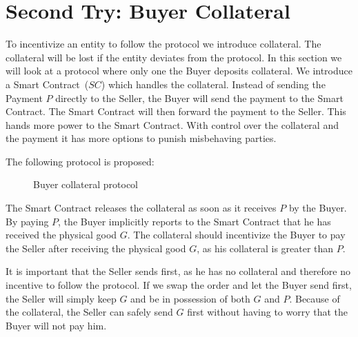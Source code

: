 \documentclass{cacthesis}
\newcommand{\authnote}[3]{{ \footnotesize \textbf{#1[#2: #3]~}}}
\newcommand{\orfnote}[1]{\authnote{\color{blue}}{Orfeas}{#1}}
\begin{document}

\section{Second Try: Buyer Collateral}
\label{sec:Buyer-collateral}
To incentivize an entity to follow the protocol we introduce collateral. The collateral will be lost if the entity deviates from the protocol. In this section we will look at a protocol where only one the Buyer deposits collateral. We introduce a Smart Contract~($SC$) which handles the collateral. 
Instead of sending the Payment $P$ directly to the Seller, the Buyer will send the payment to the Smart Contract. The Smart Contract will then forward the payment to the Seller. This hands more power to the Smart Contract. With control over the collateral and the payment it has more options to punish misbehaving parties. \newline

The following protocol is proposed:
\begin{figure}[htb!]
    \centering
    \caption{Buyer collateral protocol}
    \label{pro:Buyer-col}
\end{figure}

The Smart Contract releases the collateral as soon as it receives $P$ by the Buyer. By paying $P$, the Buyer implicitly reports to the Smart Contract that he has received the physical good $G$. The collateral should incentivize the Buyer to pay the Seller after receiving the physical good $G$, as his collateral is greater than $P$.\newline

It is important that the Seller sends first, as he has no collateral and therefore no incentive to follow the protocol. If we swap the order and let the Buyer send first, the Seller will simply keep $G$ and be in possession of both $G$ and $P$. Because of the collateral, the Seller can safely send $G$ first without having to worry that the Buyer will not pay him.\newline
\end{document}
